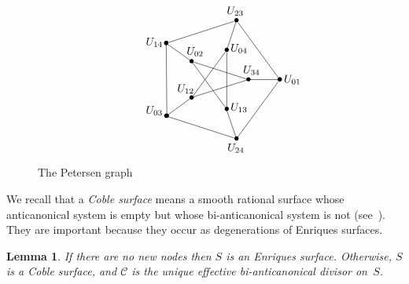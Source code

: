 \documentclass[11pt]{article}
\newtheorem{lemm}[theo]{Lemma}
\theoremstyle{definition}
\numberwithin{equation}{section}
\numberwithin{figure}{section}
\numberwithin{table}{section}
\newcommand{\calC}{\mathcal{C}}
\begin{document}
\begin{figure}[ht]
\[
\xy (-35,0)*{};(20,0)*{\bullet};(6.2,19)*{\bullet}**\dir{-};(-16.2, 11.7)*{\bullet}**\dir{-};(-16.2, 11.7)*{\bullet};(-16,-11.7)*{\bullet}**\dir{-}; (-16.2,-11.7)*{\bullet};(6.2,-19)*{\bullet}**\dir{-};(6.2,-19)*{};(20,0)*{\bullet}**\dir{-}; (10,0)*{\bullet};(-8.1,5.85)*{\bullet}**\dir{-};(-8.1,5.85)*{};(3.1, -9.5)*{\bullet}**\dir{-};(3.1, -9.5)*{};(3.1,9.5)*{\bullet}**\dir{-}; (3.1,9.5)*{};(-8.1,-5.85)*{\bullet}**\dir{-}; (-8.5,-5.85)*{};(10,0)*{}**\dir{-}; (10,0)*{};(20,0)*{}**\dir{-}; (3.1,9.5)*{};(6.2,19)*{}**\dir{-}; (-16.2, 11.7)*{};(-8.1,5.85)*{}**\dir{-};(-16.2, -11.7)*{};(-8.2,-5.85)*{}**\dir{-};(6.2, -19)*{};(3.1,-9.85)*{}**\dir{-}; (24,0)*{U_{01}};(5.8,22)*{U_{23}};(-20,12)*{U_{14}};(6,-22)*{U_{24}};(11,3)*{U_{34}};(7,10)*{U_{04}};(7,-9)*{U_{13}};(-7,9)*{U_{02}}; (-10,-3)*{U_{12}};(-20,-10)*{U_{03}};
\endxy
\]
\caption{The Petersen graph}\label{petersen}
\end{figure}

We recall that a \emph{Coble surface} means a smooth rational surface whose anticanonical system is empty but whose bi-anticanonical system is not (see~\cite{DZ}). They are important because they occur as degenerations of Enriques surfaces.

\begin{lemm}
If there are no new nodes then $S$ is an Enriques surface. Otherwise, $S$ is a Coble surface, and $\calC$ is the unique effective bi-anticanonical divisor on~$S$.
\end{lemm}
\end{document}
